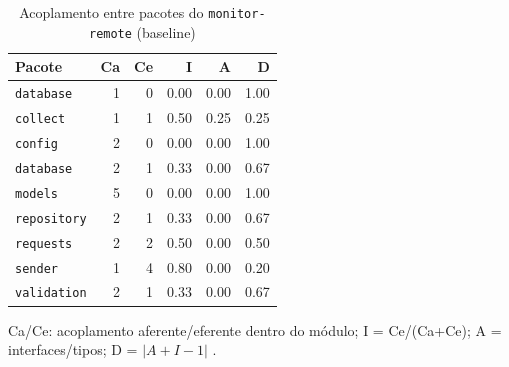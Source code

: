 \begin{table}[htbp]
  \centering\small
  \caption{Acoplamento entre pacotes do \texttt{monitor-remote} (baseline)}
  \label{tab:baseline-acoplamento-remote}
  \begin{tabular}{lrrrrr}
    \toprule
    Pacote & Ca & Ce & I & A & D \\
    \midrule
    \texttt{database} & 1 & 0 & 0.00 & 0.00 & 1.00 \\
    \texttt{collect} & 1 & 1 & 0.50 & 0.25 & 0.25 \\
    \texttt{config} & 2 & 0 & 0.00 & 0.00 & 1.00 \\
    \texttt{database} & 2 & 1 & 0.33 & 0.00 & 0.67 \\
    \texttt{models} & 5 & 0 & 0.00 & 0.00 & 1.00 \\
    \texttt{repository} & 2 & 1 & 0.33 & 0.00 & 0.67 \\
    \texttt{requests} & 2 & 2 & 0.50 & 0.00 & 0.50 \\
    \texttt{sender} & 1 & 4 & 0.80 & 0.00 & 0.20 \\
    \texttt{validation} & 2 & 1 & 0.33 & 0.00 & 0.67 \\
    \bottomrule
  \end{tabular}
  \par\smallskip\footnotesize Ca/Ce: acoplamento aferente/eferente dentro do módulo; I = Ce/(Ca+Ce); A = interfaces/tipos; D = $|A+I-1|$ \cite{martin2002}.
\end{table}


